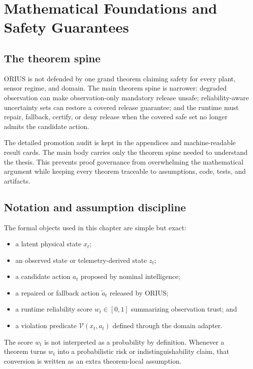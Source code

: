 \chapter{Mathematical Foundations and Safety Guarantees}
\label{ch:mathematical-foundations}

\section{The theorem spine}
ORIUS is not defended by one grand theorem claiming safety for every plant,
sensor regime, and domain. The main theorem spine is narrower: degraded
observation can make observation-only mandatory release unsafe; reliability-aware
uncertainty sets can restore a covered release guarantee; and the runtime must
repair, fallback, certify, or deny release when the covered safe set no longer
admits the candidate action.

The detailed promotion audit is kept in the appendices and machine-readable
result cards. The main body carries only the theorem spine needed to understand
the thesis. This prevents proof governance from overwhelming the mathematical
argument while keeping every theorem traceable to assumptions, code, tests, and
artifacts.

\section{Notation and assumption discipline}
The formal objects used in this chapter are simple but exact:
\begin{itemize}
  \item a latent physical state $x_t$;
  \item an observed state or telemetry-derived state $z_t$;
  \item a candidate action $a_t$ proposed by nominal intelligence;
  \item a repaired or fallback action $\tilde{a}_t$ released by ORIUS;
  \item a runtime reliability score $w_t \in [0,1]$ summarizing observation trust; and
  \item a violation predicate $\mathcal{V}(x_t, a_t)$ defined through the domain adapter.
\end{itemize}

The score $w_t$ is not interpreted as a probability by definition. Whenever a
theorem turns $w_t$ into a probabilistic risk or indistinguishability claim,
that conversion is written as an extra theorem-local assumption.

